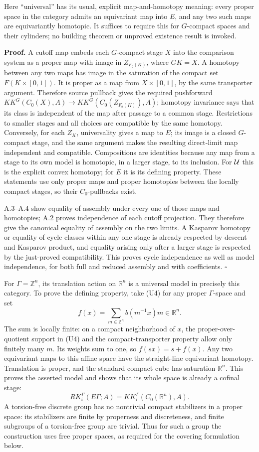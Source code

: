 \documentclass[
  11pt,
]{article}
\begin{document}
Here ``universal'' has its usual, explicit map-and-homotopy meaning:
every proper space in the category admits an equivariant map into \(E\),
and any two such maps are equivariantly homotopic. It suffices to
require this for \(G\)-compact spaces and their cylinders; no building
theorem or unproved existence result is invoked.

\textbf{Proof.} A cutoff map embeds each \(G\)-compact stage \(X\) into
the comparison system as a proper map with image in \(Z_{F_b(K)}\),
where \(GK=X\). A homotopy between any two maps has image in the
saturation of the compact set \(F(K\times[0,1])\). It is proper as a map
from \(X\times[0,1]\), by the same transporter argument. Therefore
source pullback gives the required pushforward
\(KK^G(C_0(X),A)\to KK^G(C_0(Z_{F_b(K)}),A)\); homotopy invariance says
that its class is independent of the map after passage to a common
stage. Restrictions to smaller stages and all choices are compatible by
the same homotopy. Conversely, for each \(Z_K\), universality gives a
map to \(E\); its image is a closed \(G\)-compact stage, and the same
argument makes the resulting direct-limit map independent and
compatible. Compositions are identities because any map from a stage to
its own model is homotopic, in a larger stage, to its inclusion. For
\({\cal U}\) this is the explicit convex homotopy; for \(E\) it is its
defining property. These statements use only proper maps and proper
homotopies between the locally compact stages, so their
\(C_0\)-pullbacks exist.

A.3--A.4 show equality of assembly under every one of those maps and
homotopies; A.2 proves independence of each cutoff projection. They
therefore give the canonical equality of assembly on the two limits. A
Kasparov homotopy or equality of cycle classes within any one stage is
already respected by descent and Kasparov product, and equality arising
only after a larger stage is respected by the just-proved compatibility.
This proves cycle independence as well as model independence, for both
full and reduced assembly and with coefficients. \(\square\)

For \(\Gamma=\mathbb Z^n\), its translation action on \(\mathbb R^n\) is
a universal model in precisely this category. To prove the defining
property, take (U4) for any proper \(\Gamma\)-space and set \[
 f(x)=\sum_{m\in\mathbb Z^n}b(m^{-1}x)m\in\mathbb R^n.
 \tag{U7}
\] The sum is locally finite: on a compact neighborhood of \(x\), the
proper-over-quotient support in (U4) and the compact-transporter
property allow only finitely many \(m\). Its weights sum to one, so
\(f(sx)=s+f(x)\). Any two equivariant maps to this affine space have the
straight-line equivariant homotopy. Translation is proper, and the
standard compact cube has saturation \(\mathbb R^n\). This proves the
asserted model and shows that its whole space is already a cofinal
stage: \[
 RK^\Gamma_i(E\Gamma;A)=KK^\Gamma_i(C_0(\mathbb R^n),A).
 \tag{U8}
\] A torsion-free discrete group has no nontrivial compact stabilizers
in a proper space: its stabilizers are finite by properness and
discreteness, and finite subgroups of a torsion-free group are trivial.
Thus for such a group the construction uses free proper spaces, as
required for the covering formulation below.
\end{document}

